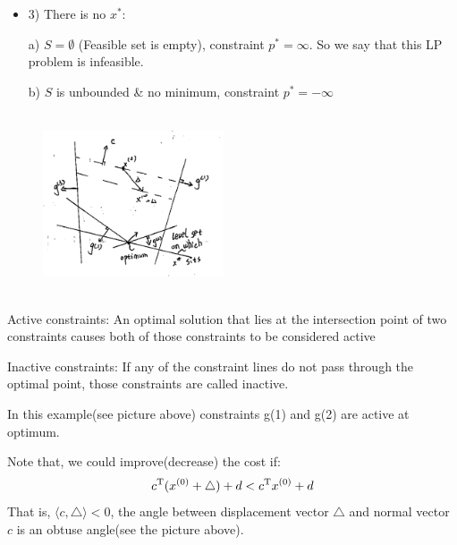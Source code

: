 \begin{example}
\begin{itemize}
		\item 3) There is no $x^*$:
		
		\quad a) $S = \emptyset$ (Feasible set is empty), constraint $p^* = \infty$. So we say that this LP problem is infeasible.
		
		\quad b) $S$ is unbounded \& no minimum, constraint $p^* = -\infty$
	\end{itemize}
	
	
	\begin{figure}
		\centering
		\includegraphics[width=2.1in,height=2.1in]{figures/ch07/figure1012_8.png}
	\end{figure}
	
	Active constraints: An optimal solution that lies at the intersection point of two constraints causes both of those constraints to be considered active
	
	Inactive constraints: If any of the constraint lines do not pass through the optimal point, those constraints are called inactive.
	
	In this example(see picture above) constraints g(1) and g(2) are active at optimum.
	
	Note that, we could improve(decrease) the cost if:
	$$c^{{\rm T}}(x^{(0)} + \triangle) + d < c^{{\rm T}}x^{(0)} + d$$
	That is, $\langle c, \triangle\rangle < 0$, the angle between displacement vector $\bigtriangleup$ and normal vector $c$ is an obtuse angle(see the picture above).
\end{example}





